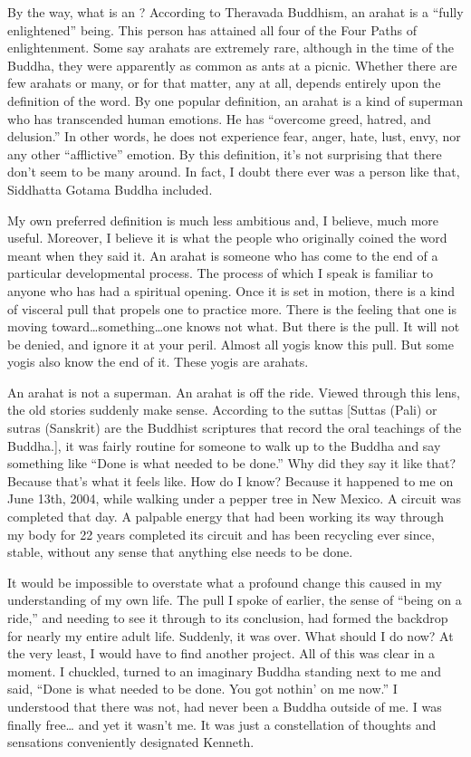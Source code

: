 \documentclass[a5paper,10pt,english]{book}
\begin{document}
\sphinxAtStartPar
By the way, what is an ? According to Theravada Buddhism, an
arahat is a “fully enlightened” being. This person has attained all four
of the Four Paths of enlightenment. Some say arahats are extremely rare,
although in the time of the Buddha, they were apparently as common as
ants at a picnic. Whether there are few arahats or many, or for that
matter, any at all, depends entirely upon the definition of the word. By
one popular definition, an arahat is a kind of superman who has
transcended human emotions. He has “overcome greed, hatred, and
delusion.” In other words, he does not experience  fear,
anger, hate, lust, envy, nor any other “afflictive” emotion. By this
definition, it’s not surprising that there don’t seem to be many around.
In fact, I doubt there ever was a person like that, Siddhatta Gotama
Buddha included.

\sphinxAtStartPar
My own preferred definition is much less ambitious and, I believe, much
more useful. Moreover, I believe it is what the people who originally
coined the word meant when they said it. An arahat is someone who has
come to the end of a particular developmental process. The process of
which I speak is familiar to anyone who has had a spiritual opening.
Once it is set in motion, there is a kind of visceral pull that propels
one to practice more. There is the feeling that one is moving
toward…something…one knows not what. But there is the pull. It will not
be denied, and ignore it at your peril. Almost all yogis know this pull.
But some yogis also know the end of it. These yogis are arahats.

\sphinxAtStartPar
An arahat is not a superman. An arahat is off the ride. Viewed through
this lens, the old stories suddenly make sense. According to the suttas
{[}Suttas (Pali) or sutras (Sanskrit) are the Buddhist scriptures that
record the oral teachings of the Buddha.{]}, it was fairly routine for
someone to walk up to the Buddha and say something like “Done is what
needed to be done.” Why did they say it like that? Because that’s what
it feels like. How do I know? Because it happened to me on June 13th,
2004, while walking under a pepper tree in New Mexico. A circuit was
completed that day. A palpable energy that had been working its way
through my body for 22 years completed its circuit and has been
recycling ever since, stable, without any sense that anything else needs
to be done.

\sphinxAtStartPar
It would be impossible to overstate what a profound change this caused
in my understanding of my own life. The pull I spoke of earlier, the
sense of “being on a ride,” and needing to see it through to its
conclusion, had formed the backdrop for nearly my entire adult life.
Suddenly, it was over. What should I do now? At the very least, I would
have to find another project. All of this was clear in a moment. I
chuckled, turned to an imaginary Buddha standing next to me and said,
“Done is what needed to be done. You got nothin’ on me now.” I
understood that there was not, had never been a Buddha outside of me. I
was finally free… and yet it wasn’t me. It was just a constellation of
thoughts and sensations conveniently designated Kenneth.
\end{document}
